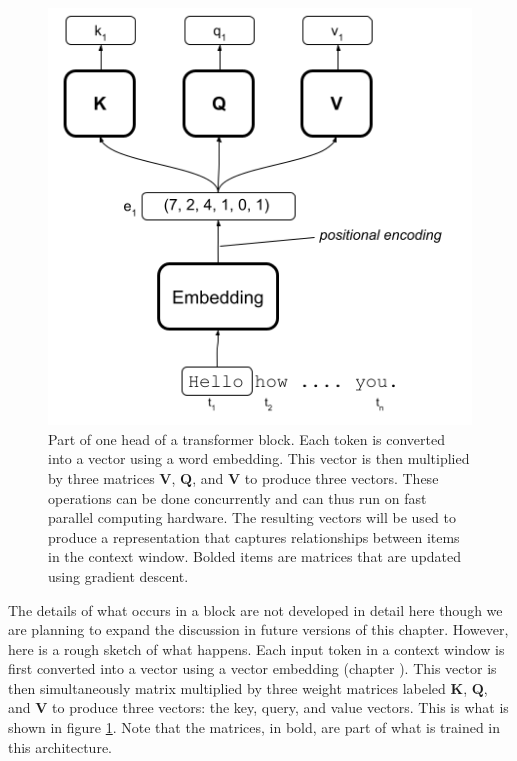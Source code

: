 \begin{figure}[h]
\centering
\includegraphics[scale=.4]{./images/transformerBlockBasic.png}
\caption[Jeff Yoshimi with consultation from Tim Meyer.]{Part of one head of a transformer block. Each token is converted into a vector using a word embedding. This vector is then multiplied by three matrices  $\textbf{V}$, $\textbf{Q}$, and $\textbf{V}$ to produce three vectors. These operations can be done concurrently and can thus run on fast parallel computing hardware. The resulting vectors will be used to produce a representation that captures relationships between items in the context window. Bolded items are matrices that are updated using gradient descent.}
\label{transformerBlockSimple}
\end{figure}

The details of what occurs in a block are not developed in detail here though we are planning to expand the discussion in future versions of this chapter. However, here is a rough sketch of what happens. Each input token in a context window is first converted into a vector using a vector embedding (chapter ). This vector is then simultaneously matrix multiplied by three weight matrices labeled $\textbf{K}$, $\textbf{Q}$, and $\textbf{V}$ to produce three vectors: the key, query, and value vectors. This is what is shown in figure \ref{transformerBlockSimple}.  Note that the matrices, in bold, are part of what is trained in this architecture.

